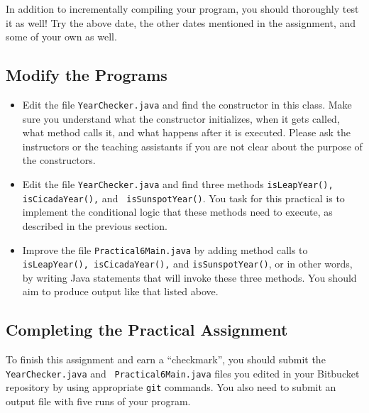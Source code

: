 \noindent In addition to incrementally compiling your program, you should thoroughly test it as well! Try the above
date, the other dates mentioned in the assignment, and some of your own as well.

\vspace*{-.1in}
\subsection*{Modify the Programs} 
\vspace*{-.05in}
\begin{itemize}

\item Edit the file {\tt YearChecker.java} and find the constructor in this class. Make sure you understand what the
  constructor initializes, when it gets called, what method calls it, and what happens after it is executed. Please ask
  the instructors or the teaching assistants if you are not clear about the purpose of the constructors. 

\item  Edit the file {\tt YearChecker.java} and find three methods {\tt isLeapYear(), isCicadaYear(),} and {\tt
  isSunspotYear()}.  You task for this practical is to implement the conditional logic that these methods need to
  execute, as described in the previous section. 

\item \begin{sloppypar} Improve the file {\tt Practical6Main.java} by adding method calls to {\tt isLeapYear(),
  isCicadaYear(),} and {\tt isSunspotYear()}, or in other words, by writing Java statements that will invoke these three
methods. You should aim to produce output like that listed above. \end{sloppypar}

\end{itemize}

\vspace*{-.25in}
\subsection*{Completing the Practical Assignment}
\vspace*{-.1in}

To finish this assignment and earn a ``checkmark'', you should submit the {\tt YearChecker.java} and {\tt
Practical6Main.java} files you edited in your Bitbucket repository by using appropriate {\tt git} commands. You
also need to submit an output file with five runs of your program.

